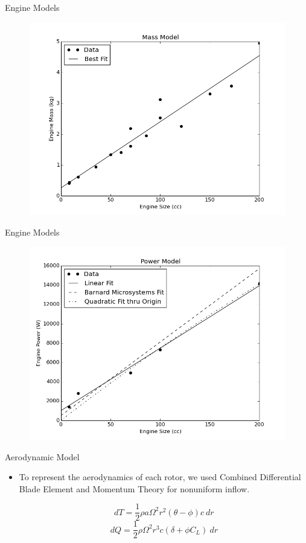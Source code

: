 \documentclass{beamer}
\begin{document}
\begin{frame}{Engine Models}

	\begin{figure}
		\begin{center}
			\includegraphics[width=.70\textwidth]{../mass.png}
			\label{fig:eng_mass}
		\end{center}
	\end{figure}
\end{frame}

\begin{frame}{Engine Models}	
	\begin{figure}
		\begin{center}
			\includegraphics[width=.70\textwidth]{../max_power.png}
			\label{fig:eng_power}
		\end{center}
	\end{figure}
	
\end{frame}

\begin{frame}{Aerodynamic Model}
	\begin{itemize}
		\item{To represent the aerodynamics of each rotor, we used Combined Differential Blade Element and Momentum Theory for nonuniform inflow.}
		\begin{center}
		$$ dT = \frac{1}{2} \rho a \Omega^2 r^2 (\theta - \phi) c \  dr $$
		$$ dQ = \frac{1}{2} \rho \Omega^2 r^3 c (\delta + \phi C_L) \ dr $$
		\end{center}
	\end{itemize}

\end{frame}
\end{document}

